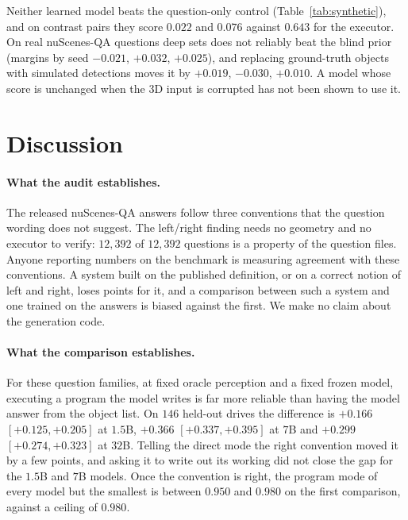 \documentclass[11pt,a4paper]{article}
\begin{document}
Neither learned model beats the question-only control
(Table~\ref{tab:synthetic}), and on contrast pairs they score $0.022$ and
$0.076$ against $0.643$ for the executor. On real
nuScenes-QA questions deep sets does not reliably beat the blind prior
(margins by seed $-0.021$, $+0.032$, $+0.025$), and replacing ground-truth
objects with simulated detections moves it by $+0.019$, $-0.030$, $+0.010$.
A model whose score is unchanged when the 3D input is corrupted has not been
shown to use it.

\section{Discussion}
\label{sec:discussion}

\paragraph{What the audit establishes.} The released nuScenes-QA answers
follow three conventions that the question wording does not suggest. The
left/right finding needs no geometry and no executor to verify: $12{,}392$
of $12{,}392$ questions is a property of the question files. Anyone reporting
numbers on the benchmark is measuring agreement with these conventions. A
system built on the published definition, or on a correct notion of left and
right, loses points for it, and a comparison between such a system and one
trained on the answers is biased against the first. We make no claim about the generation code.

\paragraph{What the comparison establishes.} For these question families, at
fixed oracle perception and a fixed frozen model, executing a program the
model writes is far more reliable than having the model answer from the
object list. On $146$ held-out drives the difference is $+0.166$ $[+0.125,
+0.205]$ at $1.5$B, $+0.366$ $[+0.337, +0.395]$ at $7$B and $+0.299$
$[+0.274, +0.323]$ at $32$B. Telling the
direct mode the right convention moved it by a few points, and asking it to
write out its working did not close the gap for the $1.5$B and $7$B models.
Once the convention is right, the program mode of every model but the
smallest is between $0.950$ and $0.980$ on the first comparison, against a
ceiling of $0.980$.
\end{document}

